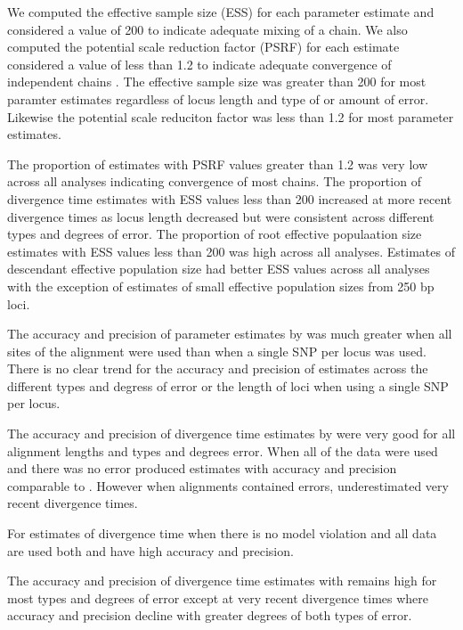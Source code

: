 We computed the effective sample size (ESS) for each parameter estimate and considered
a value of 200 to indicate adequate mixing of a chain. 
We also computed the potential scale reduction factor (PSRF) for each estimate 
considered a value of less than 1.2 to indicate adequate convergence of 
independent chains \citep{gelman1998}. 
The effective sample size was greater than 200 for most \ecoevolity paramter
estimates regardless of locus length and type of or amount of error. 
Likewise the potential scale reduciton factor was less than 1.2 for most \ecoevolity parameter estimates.

The proportion of estimates with PSRF values greater than 1.2 was very low across 
all \beast analyses indicating convergence of most chains.
The proportion of \beast divergence time estimates with ESS values less than 200 
increased at more recent divergence times as locus length decreased but were 
consistent across different types and degrees of error.
The proportion of \beast root effective populaation size estimates with ESS 
values less than 200 was high across all analyses. 
Estimates of descendant effective population size had better ESS values across all 
analyses with the exception of estimates of small effective population sizes from 
250 bp loci.

The accuracy and precision of parameter estimates by \ecoevolity was much greater
when all sites of the alignment were used than when a single SNP per locus was used.  
There is no clear trend for the accuracy and precision of \ecoevolity estimates across the
different types and degress of error or the length of loci when using a single SNP per locus. 

The accuracy and precision of divergence time estimates by \beast were very good for all 
alignment lengths and types and degrees error. When all of the data were used and 
there was no error \ecoevolity produced estimates with accuracy and precision
comparable to \beast. However when alignments contained errors, \ecoevolity
underestimated very recent divergence times. 

For estimates of divergence time when there is no model violation and all data 
are used both \ecoevolity and \beast have high accuracy and precision.

The accuracy and precision of divergence time estimates with \ecoevolity remains 
high for most types and degrees of error except at very recent divergence times 
where accuracy and precision decline with greater degrees of both types of error.

